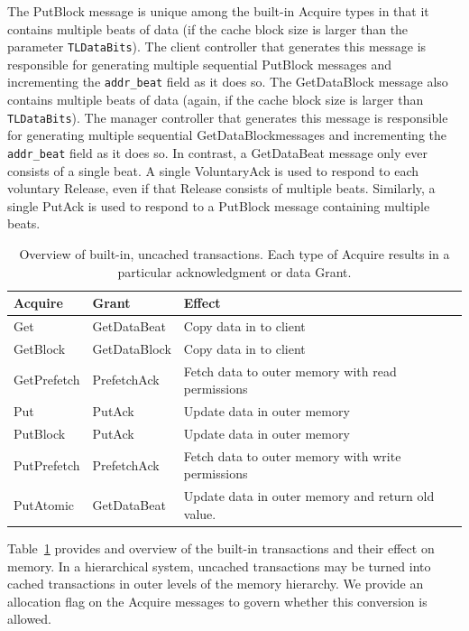 The PutBlock message is unique among the built-in Acquire types in that it contains multiple beats of data (if the cache block size is larger than the parameter {\tt TLDataBits}).
The client controller that generates this message is responsible for generating multiple sequential PutBlock messages and incrementing the {\tt addr\_beat} field as it does so.
The GetDataBlock message also contains multiple beats of data (again, if the cache block size is larger than {\tt TLDataBits}).
The manager controller that generates this message is responsible for generating multiple sequential GetDataBlockmessages and incrementing the {\tt addr\_beat} field as it does so.
In contrast, a GetDataBeat message only ever consists of a single beat.
A single VoluntaryAck is used to respond to each voluntary Release, even if that Release consists of multiple beats.
Similarly, a single PutAck is used to respond to a PutBlock message containing multiple beats.

\begin{table}[ht]
\begin{center}
\begin{tabular}{|l|l|l|}
    \hline
    Acquire & Grant & Effect \\ \hline \hline
    Get & GetDataBeat & Copy data in to client \\ \hline
    GetBlock & GetDataBlock & Copy data in to client \\ \hline
    GetPrefetch & PrefetchAck & Fetch data to outer memory with read permissions \\ \hline
    Put & PutAck & Update data in outer memory \\ \hline
    PutBlock & PutAck & Update data in outer memory \\ \hline
    PutPrefetch & PrefetchAck & Fetch data to outer memory with write permissions \\ \hline
    PutAtomic & GetDataBeat & Update data in outer memory and return old value. \\ \hline
\end{tabular}
\end{center}
\caption[Overview of built-in, uncached transactions.]{
Overview of built-in, uncached transactions. Each type of Acquire results in a particular acknowledgment or data Grant.}
\label{tab:uncached}
\end{table}

Table~\ref{tab:uncached} provides and overview of the built-in transactions and their effect on memory.
In a hierarchical system, uncached transactions may be turned into cached transactions in outer levels of the memory hierarchy.
We provide an allocation flag on the Acquire messages to govern whether this conversion is allowed.

